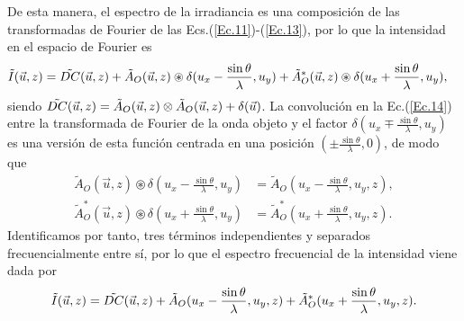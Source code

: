 \documentclass[12pt]{article}
\begin{document}
De esta manera,  el espectro de la irradiancia es una composición de las transformadas de Fourier de las Ecs.(\ref{Ec.11})-(\ref{Ec.13}), por lo que la intensidad en el espacio de Fourier es
\begin{align}
     \tilde{I}(\Vec{u},z) &=  \Tilde{DC}(\Vec{u},z) + \tilde{A}_O(\Vec{u}, z) \circledast \delta(u_x - \frac{\sin{\theta}}{\lambda}, u_y) + \tilde{A}^{*}_O(\Vec{u}, z) \circledast \delta(u_x +\frac{\sin{\theta}}{\lambda}, u_y),
     \label{Ec.14}
\end{align}
siendo  $\tilde{DC}( \Vec{u}, z) = \Tilde{A}_O (\Vec{u},z) \otimes \tilde{A}_O (\Vec{u},z) + \delta(\Vec{u})$. La convolución  en la Ec.(\ref{Ec.14}) entre la transformada de Fourier de la onda objeto  y el factor $ \delta(u_{x} \mp \frac{\sin{\theta}}{\lambda}, u_y)$ es una versión de esta función centrada en una posición $(\pm \frac{\sin{\theta}}{\lambda}, 0)$, de modo que 
\begin{align}
     \tilde{A}_O(\Vec{u}, z) \circledast \delta(u_x - \frac{\sin{\theta}}{\lambda}, u_y) &= \tilde{A}_O (u_x - \frac{\sin{\theta}}{\lambda}, u_y,z), \nonumber \\
      \tilde{A}^{*}_O(\Vec{u}, z) \circledast \delta(u_x + \frac{\sin{\theta}}{\lambda}, u_y) &= \tilde{A}^{*}_O (u_x +\frac{\sin{\theta}}{\lambda}, u_y,z).
     \label{Ec.15}
\end{align}
Identificamos por tanto, tres términos independientes y separados frecuencialmente entre sí, por lo que el espectro frecuencial de la intensidad viene dada por 
\begin{equation}
     \Tilde{I}(\vec{u}, z) = \tilde{DC}( \Vec{u}, z) + \tilde{A}_O (u_x -\frac{\sin{\theta}}{\lambda}, u_y,z) + \tilde{A}_O^{*} (u_x +\frac{\sin{\theta}}{\lambda}, u_y,z).
     \label{Ec.16}
\end{equation}
\end{document}
